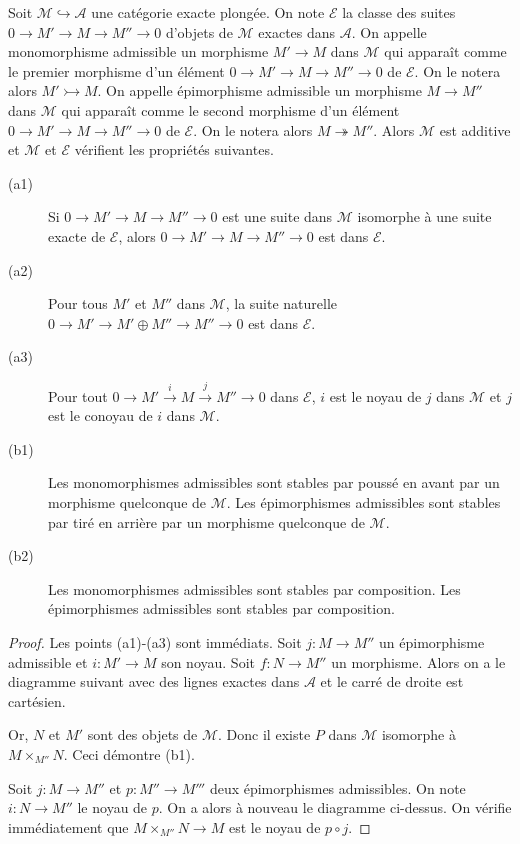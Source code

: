 \documentclass{amsart}
\theoremstyle{plain}
\theoremstyle{definition}
\theoremstyle{remark}
\newcommand{\M}{\mathcal{M}}
\newcommand{\A}{\mathcal{A}}
\newcommand{\E}{\mathcal{E}}
\newcommand{\ra}{\rightarrow}
\newcommand{\lra}{\longrightarrow}
\newcommand{\mono}{\rightarrowtail}
\newcommand{\epi}{\twoheadrightarrow}
\newcommand{\exa}[3]{0\ra {#1}\ra {#2}\ra {#3}\ra 0}
\newcommand{\exaname}[5]{0\ra {#1}\xrightarrow{#2} {#3}\xrightarrow{#4} {#5}\ra 0}
\begin{document}
Soit $\M\hookrightarrow\A$ une catégorie exacte plongée. On note $\E$ la classe des suites $\exa{M'}{M}{M''}$ d'objets de $\M$ exactes dans $\A$.
On appelle monomorphisme admissible un morphisme $M'\lra M$ dans $\M$ qui apparaît comme le premier morphisme d'un élément $\exa{M'}{M}{M''}$ de $\E$.
On le notera alors $M'\mono M$.
On appelle épimorphisme admissible un morphisme $M\lra M''$ dans $\M$ qui apparaît comme le second morphisme d'un élément $\exa{M'}{M}{M''}$ de $\E$.
On le notera alors $M\epi M''$.
Alors $\M$ est additive et $\M$ et $\E$ vérifient les propriétés suivantes.
\begin{description}
  \item[(a1)] Si $\exa{M'}{M}{M''}$ est une suite dans $\M$ isomorphe à une suite exacte de $\E$, alors $\exa{M'}{M}{M''}$ est dans $\E$.
  \item[(a2)] Pour tous $M'$ et $M''$ dans $\M$, la suite naturelle $\exa{M'}{M'\oplus M''}{M''}$ est dans $\E$.
  \item[(a3)] Pour tout $\exaname{M'}{i}{M}{j}{M''}$ dans $\E$, $i$ est le noyau de $j$ dans $\M$ et $j$ est le conoyau de $i$ dans $\M$.
  \item[(b1)] Les monomorphismes admissibles sont stables par poussé en avant par un morphisme quelconque de $\mathcal{M}$. Les épimorphismes admissibles sont
              stables par tiré en arrière par un morphisme quelconque de $\mathcal{M}$.
  \item[(b2)] Les monomorphismes admissibles sont stables par composition. Les épimorphismes admissibles sont stables par composition. 
\end{description}

\begin{proof}
  Les points (a1)-(a3) sont immédiats. Soit $j:M\ra M''$ un épimorphisme admissible et $i:M'\ra M$ son noyau. Soit $f:N\ra M''$ un morphisme.
  Alors on a le diagramme suivant avec des lignes exactes dans $\A$ et le carré de droite est cartésien.
  \begin{center}
  \end{center}
  Or, $N$ et $M'$ sont des objets de $\M$. Donc il existe $P$ dans $\M$ isomorphe à $M\times_{M''}N$. Ceci démontre (b1).

  Soit $j:M\ra M''$ et $p:M''\ra M'''$ deux épimorphismes admissibles. On note $i:N\ra M''$ le noyau de $p$.
  On a alors à nouveau le diagramme ci-dessus. On vérifie immédiatement que $M\times_{M''}N\ra M$ est le noyau de $p\circ j$.
\end{proof}
\end{document}

